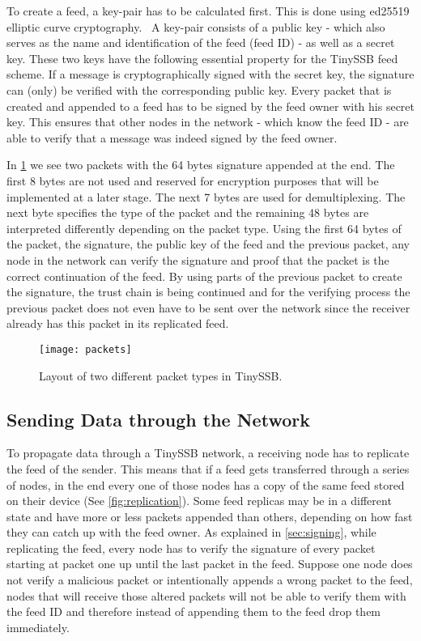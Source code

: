To create a feed, a key-pair has to be calculated first. This is done using ed25519 elliptic curve cryptography.~\cite{9519456} A key-pair consists of a public key - which also serves as the name and identification of the feed (feed ID) - as well as a secret key. These two keys have the following essential property for the TinySSB feed scheme. If a message is cryptographically signed with the secret key, the signature can (only) be verified with the corresponding public key. Every packet that is created and appended to a feed has to be signed by the feed owner with his secret key. This ensures that other nodes in the network - which know the feed ID - are able to verify that a message was indeed signed by the feed owner.

In \cref{fig:packets} we see two packets with the 64 bytes signature appended at the end. The first 8 bytes are not used and reserved for encryption purposes that will be implemented at a later stage. The next 7 bytes are used for demultiplexing. The next byte specifies the type of the packet and the remaining 48 bytes are interpreted differently depending on the packet type. Using the first 64 bytes of the packet, the signature, the public key of the feed and the previous packet, any node in the network can verify the signature and proof that the packet is the correct continuation of the feed. By using parts of the previous packet to create the signature, the trust chain is being continued and for the verifying process the previous packet does not even have to be sent over the network since the receiver already has this packet in its replicated feed.~\cite{tinySSB}\\

\begin{figure}
\centering
\texttt{[image: packets]}
\caption{Layout of two different packet types in TinySSB.}
\label{fig:packets}
\end{figure}

\subsection{Sending Data through the Network}
\label{sec:sending}
To propagate data through a TinySSB network, a receiving node has to replicate the feed of the sender. This means that if a feed gets transferred through a series of nodes, in the end every one of those nodes has a copy of the same feed stored on their device (See \cref{fig:replication}). Some feed replicas may be in a different state and have more or less packets appended than others, depending on how fast they can catch up with the feed owner. As explained in \cref{sec:signing}, while replicating the feed, every node has to verify the signature of every packet starting at packet one up until the last packet in the feed. Suppose one node does not verify a malicious packet or intentionally appends a wrong packet to the feed, nodes that will receive those altered packets will not be able to verify them with the feed ID and therefore instead of appending them to the feed drop them immediately.

